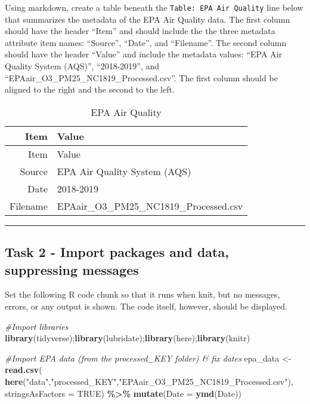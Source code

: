 \documentclass[
]{article}
\newenvironment{Shaded}{\begin{snugshade}}{\end{snugshade}}
\newcommand{\AttributeTok}[1]{\textcolor[rgb]{0.13,0.29,0.53}{#1}}
\newcommand{\CommentTok}[1]{\textcolor[rgb]{0.56,0.35,0.01}{\textit{#1}}}
\newcommand{\ConstantTok}[1]{\textcolor[rgb]{0.56,0.35,0.01}{#1}}
\newcommand{\FunctionTok}[1]{\textcolor[rgb]{0.13,0.29,0.53}{\textbf{#1}}}
\newcommand{\NormalTok}[1]{#1}
\newcommand{\OtherTok}[1]{\textcolor[rgb]{0.56,0.35,0.01}{#1}}
\newcommand{\SpecialCharTok}[1]{\textcolor[rgb]{0.81,0.36,0.00}{\textbf{#1}}}
\newcommand{\StringTok}[1]{\textcolor[rgb]{0.31,0.60,0.02}{#1}}
\begin{document}
Using markdown, create a table beneath the
\texttt{Table:\ EPA\ Air\ Quality} line below that summarizes the
metadata of the EPA Air Quality data. The first column should have the
header ``Item'' and should include the the three metadata attribute item
names: ``Source'', ``Date'', and ``Filename''. The second column should
have the header ``Value'' and include the metadata values: ``EPA Air
Quality System (AQS)'', ``2018-2019'', and
``EPAair\_O3\_PM25\_NC1819\_Processed.csv''. The first column should be
aligned to the right and the second to the left.

\begin{longtable}[]{@{}rl@{}}
\caption{EPA Air Quality}\tabularnewline
\toprule\noalign{}
Item & Value \\
\midrule\noalign{}
\endfirsthead
\toprule\noalign{}
Item & Value \\
\midrule\noalign{}
\endhead
\bottomrule\noalign{}
\endlastfoot
Source & EPA Air Quality System (AQS) \\
Date & 2018-2019 \\
Filename & EPAair\_O3\_PM25\_NC1819\_Processed.csv \\
\end{longtable}

\begin{center}\rule{0.5\linewidth}{0.5pt}\end{center}

\hypertarget{task-2---import-packages-and-data-suppressing-messages}{%
\subsection{Task 2 - Import packages and data, suppressing
messages}\label{task-2---import-packages-and-data-suppressing-messages}}

Set the following R code chunk so that it runs when knit, but no
messages, errors, or any output is shown. The code itself, however,
should be displayed.

\begin{Shaded}
\begin{Highlighting}[]
\CommentTok{\#Import libraries}
\FunctionTok{library}\NormalTok{(tidyverse);}\FunctionTok{library}\NormalTok{(lubridate);}\FunctionTok{library}\NormalTok{(here);}\FunctionTok{library}\NormalTok{(knitr)}

\CommentTok{\#Import EPA data (from the processed\_KEY folder) \& fix dates}
\NormalTok{epa\_data }\OtherTok{\textless{}{-}} \FunctionTok{read.csv}\NormalTok{(}
  \FunctionTok{here}\NormalTok{(}\StringTok{"data"}\NormalTok{,}\StringTok{"processed\_KEY"}\NormalTok{,}\StringTok{"EPAair\_O3\_PM25\_NC1819\_Processed.csv"}\NormalTok{),}
  \AttributeTok{stringsAsFactors =} \ConstantTok{TRUE}\NormalTok{) }\SpecialCharTok{\%\textgreater{}\%} 
  \FunctionTok{mutate}\NormalTok{(}\AttributeTok{Date =} \FunctionTok{ymd}\NormalTok{(Date))}
\end{Highlighting}
\end{Shaded}
\end{document}
